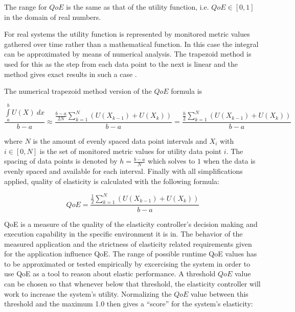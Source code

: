 \documentclass[english]{tktltiki2}
\theoremstyle{definition}
\theoremstyle{remark}
\begin{document}
The range for $QoE$ is the same as that of the utility function, i.e. $QoE \in [0, 1]$ in the domain of real numbers.

For real systems the utility function is represented by monitored metric values
gathered over time rather than a mathematical function. In this case the
integral can be approximated by means of numerical analysis. The trapezoid
method  is used for this as the step from each data
point to the next is linear and the method gives exact results in such a case
.

The numerical trapezoid method version of the $QoE$ formula is

\begin{equation}
\frac{\int\limits_a^b U(X)~dx}{b-a} \approx 
\frac{\frac{b-a}{2N}\sum\limits_{k=1}^N (U(X_{k-1}) + U(X_{k}))}{b-a} = 
\frac{\frac{h}{2}\sum\limits_{k=1}^N (U(X_{k-1}) + U(X_{k}))}{b-a} 
\label{eq:qoefunctionnumerical}
\end{equation}

where $N$ is the amount of evenly spaced data point intervals and $X_{i}$ with
$i \in [0, N]$ is the set of monitored metric values for utility data
point $i$. The spacing of data points is denoted by $h = \frac{b-a}{N}$ which
solves to $1$ when the data is evenly spaced and available for each interval.
Finally with all simplifications applied, quality of elasticity is calculated
with the following formula:

\begin{equation}
QoE = \frac{\frac{1}{2}\sum\limits_{k=1}^N (U(X_{k-1}) + U(X_{k}))}{b-a} 
\label{eq:qoefunctionnumericalfinal}
\end{equation}

QoE is a measure of the quality of the elasticity controller's decision making
and execution capability in the specific environment it is in. The behavior of
the measured application and the strictness of elasticity related requirements
given for the application influence QoE. The range of possible runtime QoE
values has to be approximated or tested empirically by excercising the system in
order to use QoE as a tool to reason about elastic performance. A threshold
$QoE$ value can be chosen so that whenever below that threshold, the elasticity
controller will work to increase the system's utility. Normalizing the $QoE$
value between this threshold and the maximum 1.0 then gives a ``score'' for the
system's elasticity:
\end{document}
